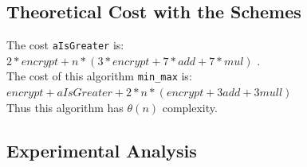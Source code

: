 \documentclass{acm_proc_article-sp}
\begin{document}
\subsection{Theoretical Cost with the Schemes}

The cost \texttt{aIsGreater} is:\\
 $2*encrypt+n*(3*encrypt+7*add+7*mul)$ .\\
The cost of this algorithm \texttt{min\_max} is:\\
$ encrypt+aIsGreater+2*n*(encrypt+3add+3mull)$\\
Thus this algorithm has $\theta(n)$ complexity. 

\subsection{Experimental Analysis}
\end{document}

